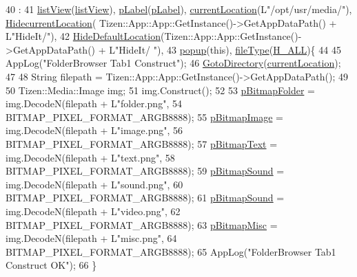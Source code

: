 \begin{DoxyCode}
40                                                                   :
41         \hyperlink{class_folder_browser_aee2bb8ad9f494b0ada8ee359a2e34555}{listView}(\hyperlink{class_folder_browser_aee2bb8ad9f494b0ada8ee359a2e34555}{listView}), \hyperlink{class_folder_browser_ac56283b5a6a8dc00438d7bf4625c82bd}{pLabel}(\hyperlink{class_folder_browser_ac56283b5a6a8dc00438d7bf4625c82bd}{pLabel}), 
      \hyperlink{class_folder_browser_a1f7bc249da2f28c6a03759a983eacf75}{currentLocation}(L\textcolor{stringliteral}{"/opt/usr/media/"}), \hyperlink{class_folder_browser_acfb2670184ff88e3b06e2562d02983ce}{HidecurrentLocation}(
      Tizen::App::App::GetInstance()->GetAppDataPath() + L\textcolor{stringliteral}{"HideIt/"}),
42         \hyperlink{class_folder_browser_a7573f676c492fcd3a5d63319cd5eb325}{HideDefaultLocation}(Tizen::App::App::GetInstance()->GetAppDataPath() + L\textcolor{stringliteral}{"HideIt/
      "}),
43         \hyperlink{class_folder_browser_a9715e8af0c63d75be7c1d65f3c4b47f8}{popup}(\textcolor{keyword}{this}), \hyperlink{class_folder_browser_ab240fcb3674e6887f601fd23c25477f3}{fileType}(\hyperlink{_folder_browser_8h_af547d73b85f475c4abfafdb76bf0c301aad30772cd86a5fa22262bf9c16c2eb42}{H\_ALL})\{
44 
45     AppLog(\textcolor{stringliteral}{"FolderBrowser Tab1 Construct"});
46     \hyperlink{class_folder_browser_a00c58611b113347764a8ca6bb7b14eca}{GotoDirectory}(\hyperlink{class_folder_browser_a1f7bc249da2f28c6a03759a983eacf75}{currentLocation});
47 
48     String filepath = Tizen::App::App::GetInstance()->GetAppDataPath();
49 
50     Tizen::Media::Image img;
51     img.Construct();
52 
53     \hyperlink{class_folder_browser_a59c025c6956a8a9ef74395d12261a36e}{pBitmapFolder} = img.DecodeN(filepath + L\textcolor{stringliteral}{"folder.png"},
54             BITMAP\_PIXEL\_FORMAT\_ARGB8888);
55     \hyperlink{class_folder_browser_a4d40caed1664eca59bbf9e3da1cde15c}{pBitmapImage} = img.DecodeN(filepath + L\textcolor{stringliteral}{"image.png"},
56             BITMAP\_PIXEL\_FORMAT\_ARGB8888);
57     \hyperlink{class_folder_browser_ac204936172a6e66bcf444e2cd9ff7ec4}{pBitmapText} = img.DecodeN(filepath + L\textcolor{stringliteral}{"text.png"},
58             BITMAP\_PIXEL\_FORMAT\_ARGB8888);
59     \hyperlink{class_folder_browser_a375413fdf422f14ee9ea6ab055ffaebd}{pBitmapSound} = img.DecodeN(filepath + L\textcolor{stringliteral}{"sound.png"},
60             BITMAP\_PIXEL\_FORMAT\_ARGB8888);
61     \hyperlink{class_folder_browser_a375413fdf422f14ee9ea6ab055ffaebd}{pBitmapSound} = img.DecodeN(filepath + L\textcolor{stringliteral}{"video.png"},
62             BITMAP\_PIXEL\_FORMAT\_ARGB8888);
63     \hyperlink{class_folder_browser_aa92204857b0b7a8d056ab74f5d9bc962}{pBitmapMisc} = img.DecodeN(filepath + L\textcolor{stringliteral}{"misc.png"},
64             BITMAP\_PIXEL\_FORMAT\_ARGB8888);
65     AppLog(\textcolor{stringliteral}{"FolderBrowser Tab1 Construct OK"});
66 \}
\end{DoxyCode}


